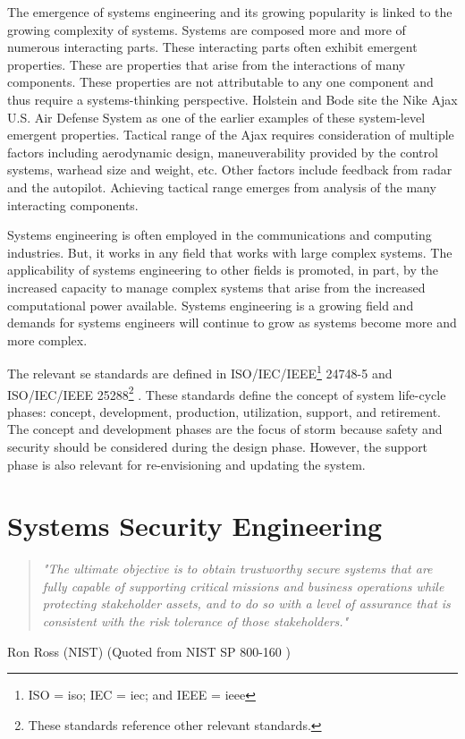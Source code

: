 \documentclass[../../main/main.tex]{subfiles}
\begin{document}
The emergence of systems engineering and its growing popularity is linked to the growing complexity of systems.  Systems are composed more and more of numerous interacting parts.  These interacting parts often exhibit emergent properties.  These are properties that arise from the interactions of many components.  These properties are not attributable to any one component and thus require a systems-thinking perspective. Holstein and Bode site the Nike Ajax U.S. Air Defense System as one of the earlier examples of these system-level emergent properties. Tactical range of the Ajax requires consideration of multiple factors including aerodynamic design, maneuverability provided by the control systems, warhead size and weight, etc.  Other factors include feedback from radar and the autopilot.  Achieving tactical range emerges from analysis of the many interacting components.  

Systems engineering is often employed in the communications and computing industries. But, it works in any field that works with large complex systems.  The applicability of systems engineering to other fields is promoted, in part, by the increased capacity to manage complex systems that arise from the increased computational power available.  Systems engineering is a growing field and demands for systems engineers will continue to grow as systems become more and more complex.

The relevant \gls{se} standards are defined in ISO/IEC/IEEE\footnote{ISO = \Gls{iso}; IEC = \Gls{iec}; and IEEE = \Gls{ieee}} 24748-5 \cite{iso247482017} and ISO/IEC/IEEE 25288\footnote{These standards reference other relevant standards.} \cite{iso15288}.  These standards define the concept of system life-cycle phases: concept, development, production, utilization, support, and retirement.  The concept and development phases are the focus of \gls{storm} because safety and security should be considered during the design phase.  However, the support phase is also relevant for re-envisioning and updating the system.  

\section{Systems Security Engineering}\label{sesc:sse}
\begin{quote}
\textit{"The ultimate objective is to obtain trustworthy secure systems that are fully capable of supporting critical missions and business operations while protecting stakeholder assets, and to do so with a level of assurance that is consistent with the risk tolerance of those stakeholders."}
\end{quote}
Ron Ross (NIST) (Quoted from NIST SP 800-160 \cite{NIST800160})
\end{document}
